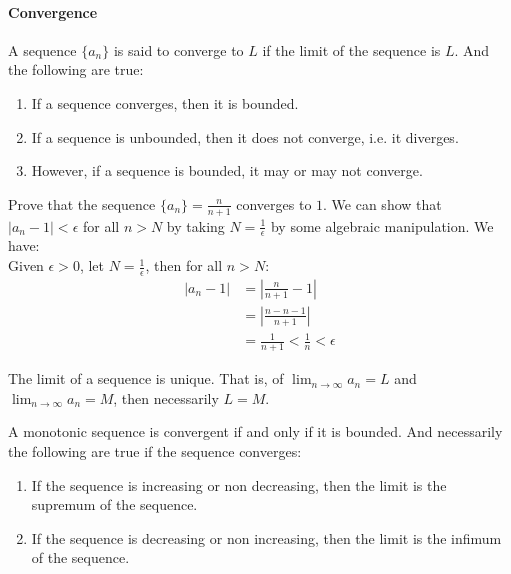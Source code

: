 \documentclass[11pt]{article}
\begin{document}
\paragraph{Convergence} A sequence $\{a_n\}$ is said to converge to $L$ if the limit of the sequence is $L$. And the following are true:
\begin{enumerate}
    \item If a sequence converges, then it is bounded.
    \item If a sequence is unbounded, then it does not converge, i.e. it diverges.
    \item However, if a sequence is bounded, it may or may not converge.
\end{enumerate}
\begin{example}
    Prove that the sequence $\{a_n\} = \frac{n}{n+1}$ converges to $1$. We can show that $|a_n - 1| < \epsilon$ for all $n > N$ by taking $N = \frac{1}{\epsilon}$ by some algebraic manipulation. We have:\\
    Given $\epsilon > 0$, let $N = \frac{1}{\epsilon}$, then for all $n > N$:
    \begin{align*}
        |a_n - 1| &= |\frac{n}{n+1} - 1| \\
        &= |\frac{n - n - 1}{n+1}| \\
        &= \frac{1}{n+1} < \frac{1}{n} < \epsilon
    \end{align*}
\end{example}
\begin{theorem}
    The limit of a sequence is unique. That is, of $\lim_{n \to \infty} a_n = L$ and $\lim_{n \to \infty} a_n = M$, then necessarily $L = M$.
\end{theorem}
\begin{theorem}
    A monotonic sequence is convergent if and only if it is bounded. And necessarily the following are true if the sequence converges:
    \begin{enumerate}
        \item If the sequence is increasing or non decreasing, then the limit is the supremum of the sequence.
        \item If the sequence is decreasing or non increasing, then the limit is the infimum of the sequence.
    \end{enumerate}
\end{theorem}
\end{document}
